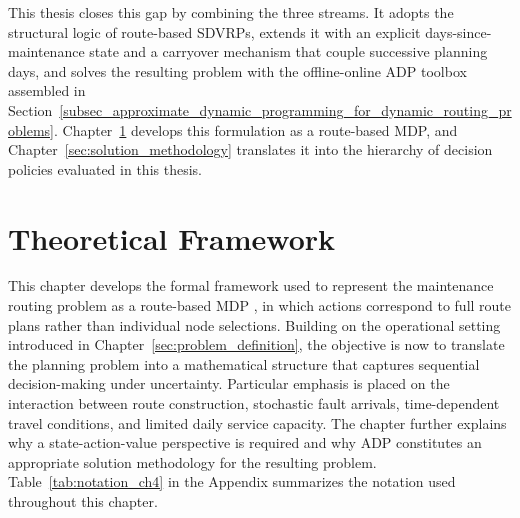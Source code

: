 \documentclass[12pt,oneside]{article}
\begin{document}
\begin{table}[htbp]
\centering
\caption{Positioning of this thesis relative to the closest related works.}
\label{tab:research_gap}
\end{table}

This thesis closes this gap by combining the three streams. It adopts the structural logic of route-based SDVRPs, extends it with an explicit days-since-maintenance state and a carryover mechanism that couple successive planning days, and solves the resulting problem with the offline-online ADP toolbox assembled in Section~\ref{subsec_approximate_dynamic_programming_for_dynamic_routing_problems}. Chapter~\ref{sec:theoretical_framework} develops this formulation as a route-based MDP, and Chapter~\ref{sec:solution_methodology} translates it into the hierarchy of decision policies evaluated in this thesis.

\section{Theoretical Framework}\label{sec:theoretical_framework}
This chapter develops the formal framework used to represent the maintenance routing problem as a route-based MDP \citep{ulmer2020modeling}, in which actions correspond to full route plans rather than individual node selections. Building on the operational setting introduced in Chapter~\ref{sec:problem_definition}, the objective is now to translate the planning problem into a mathematical structure that captures sequential decision-making under uncertainty. Particular emphasis is placed on the interaction between route construction, stochastic fault arrivals, time-dependent travel conditions, and limited daily service capacity. The chapter further explains why a state-action-value perspective is required and why ADP constitutes an appropriate solution methodology for the resulting problem. Table~\ref{tab:notation_ch4} in the Appendix summarizes the notation used throughout this chapter.
\end{document}
